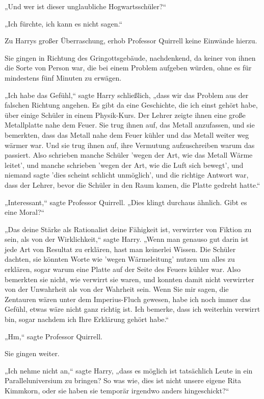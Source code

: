 {„Und wer ist dieser unglaubliche Hogwartsschüler?“

„Ich fürchte, ich kann es nicht sagen.“

Zu Harrys großer Überraschung, erhob Professor Quirrell keine Einwände hierzu.

Sie gingen in Richtung des Gringottsgebäude, nachdenkend, da keiner von ihnen die Sorte von Person war, die bei einem Problem aufgeben würden, ohne es für mindestens fünf Minuten zu erwägen.

„Ich habe das Gefühl,“ sagte Harry schließlich, „dass wir das Problem aus der falschen Richtung angehen. Es gibt da eine Geschichte, die ich einst gehört habe, über einige Schüler in einem Physik-Kurs. Der Lehrer zeigte ihnen eine große Metallplatte nahe dem Feuer. Sie trug ihnen auf, das Metall anzufassen, und sie bemerkten, dass das Metall nahe dem Feuer kühler und das Metall weiter weg wärmer war. Und sie trug ihnen auf, ihre Vermutung aufzuschreiben warum das passiert. Also schrieben manche Schüler 'wegen der Art, wie das Metall Wärme leitet', und manche schrieben 'wegen der Art, wie die Luft sich bewegt', und niemand sagte 'dies scheint schlicht unmöglich', und die richtige Antwort war, dass der Lehrer, bevor die Schüler in den Raum kamen, die Platte gedreht hatte.“

„Interessant,“ sagte Professor Quirrell. „Dies klingt durchaus ähnlich. Gibt es eine Moral?“

„Das deine Stärke als Rationalist deine Fähigkeit ist, verwirrter von Fiktion zu sein, als von der Wirklichkeit,“ sagte Harry. „Wenn man genauso gut darin ist jede Art von Resultat zu erklären, hast man keinerlei Wissen. Die Schüler dachten, sie könnten Worte wie 'wegen Wärmeleitung' nutzen um alles zu erklären, sogar warum eine Platte auf der Seite des Feuers kühler war. Also bemerkten sie nicht, wie verwirrt sie waren, und konnten damit nicht verwirrter von der Unwahrheit als von der Wahrheit sein. Wenn Sie mir sagen, die Zentauren wären unter dem Imperius-Fluch gewesen, habe ich noch immer das Gefühl, etwas wäre nicht ganz richtig ist. Ich bemerke, dass ich weiterhin verwirrt bin, sogar nachdem ich Ihre Erklärung gehört habe.“

„Hm,“ sagte Professor Quirrell.

Sie gingen weiter.

„Ich nehme nicht an,“ sagte Harry, „dass es möglich ist tatsächlich Leute in ein Paralleluniversium zu bringen? So was wie, dies ist nicht unsere eigene Rita Kimmkorn, oder sie haben sie temporär irgendwo anders hingeschickt?“

}
